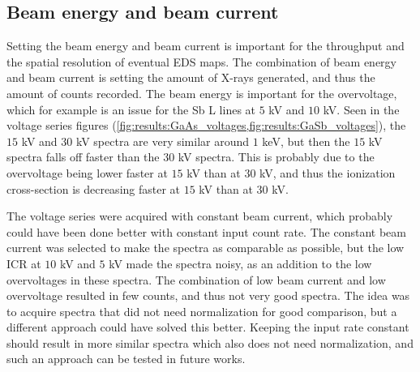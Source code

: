 \subsection{Beam energy and beam current}
\label{discussion:beam_energy_current}

Setting the beam energy and beam current is important for the throughput and the spatial resolution of eventual EDS maps.
The combination of beam energy and beam current is setting the amount of X-rays generated, and thus the amount of counts recorded.
The beam energy is important for the overvoltage, which for example is an issue for the Sb L lines at $5$ kV and $10$ kV.
Seen in the voltage series figures (\cref{fig:results:GaAs_voltages,fig:results:GaSb_voltages}), the $15$ kV and $30$ kV spectra are very similar around $1$ keV, but then the $15$ kV spectra falls off faster than the $30$ kV spectra.
This is probably due to the overvoltage being lower faster at $15$ kV than at $30$ kV, and thus the ionization cross-section is decreasing faster at $15$ kV than at $30$ kV.

The voltage series were acquired with constant beam current, which probably could have been done better with constant input count rate.
The constant beam current was selected to make the spectra as comparable as possible, but the low ICR at $10$ kV and $5$ kV made the spectra noisy, as an addition to the low overvoltages in these spectra.
The combination of low beam current and low overvoltage resulted in few counts, and thus not very good spectra.
The idea was to acquire spectra that did not need normalization for good comparison, but a different approach could have solved this better.
Keeping the input rate constant should result in more similar spectra which also does not need normalization, and such an approach can be tested in future works.


